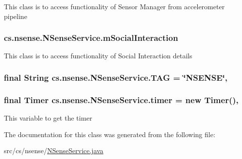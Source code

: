 This class is to access functionality of Sensor Manager from accelerometer pipeline \hypertarget{classcs_1_1nsense_1_1_n_sense_service_a2e18e70a828e22a07fc06294c3392ad3}{
\subsubsection[{m\-Social\-Interaction}]{ cs.\-nsense.\-N\-Sense\-Service.\-m\-Social\-Interaction\hspace{0.3cm}{\ttfamily [private]}}}\label{classcs_1_1nsense_1_1_n_sense_service_a2e18e70a828e22a07fc06294c3392ad3}
This class is to access functionality of Social Interaction details \hypertarget{classcs_1_1nsense_1_1_n_sense_service_ae0eb9066c3f41670fc1a9c4177d5a99b}{
\subsubsection[{T\-A\-G}]{\setlength{\rightskip}{0pt plus 5cm}final String cs.\-nsense.\-N\-Sense\-Service.\-T\-A\-G = \char`\"{}N\-S\-E\-N\-S\-E\char`\"{}\hspace{0.3cm}{\ttfamily [static]}, {\ttfamily [private]}}}\label{classcs_1_1nsense_1_1_n_sense_service_ae0eb9066c3f41670fc1a9c4177d5a99b}
\hypertarget{classcs_1_1nsense_1_1_n_sense_service_a3502f9c1fd99b7a3c102aebbf0f954e5}{
\subsubsection[{timer}]{\setlength{\rightskip}{0pt plus 5cm}final Timer cs.\-nsense.\-N\-Sense\-Service.\-timer = new Timer()\hspace{0.3cm}{\ttfamily [static]}, {\ttfamily [private]}}}\label{classcs_1_1nsense_1_1_n_sense_service_a3502f9c1fd99b7a3c102aebbf0f954e5}
This variable to get the timer 

The documentation for this class was generated from the following file\-:\begin{DoxyCompactItemize}
\item 
src/cs/nsense/\hyperlink{_n_sense_service_8java}{N\-Sense\-Service.\-java}\end{DoxyCompactItemize}
